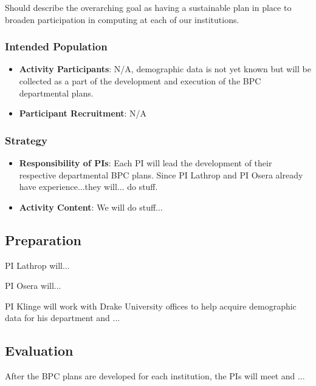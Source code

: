 \documentclass[11pt]{article}
\begin{document}
    Should describe the overarching goal as having a sustainable plan in place to broaden participation in computing at each of our institutions.

    \subsubsection{Intended Population}
    \begin{itemize}
    	\item 
	    \textbf{Activity Participants}: N/A, demographic data is not yet known but will be collected as a part of the development and execution of the BPC departmental plans.

	    \item 
	    \textbf{Participant Recruitment}: N/A
    \end{itemize}

    \subsubsection{Strategy}

    \begin{itemize}
    	\item 
	    \textbf{Responsibility of PIs}: Each PI will lead the development of their respective departmental BPC plans.
	    Since PI Lathrop and PI Osera already have experience...they will... do stuff.

	    \item 
	    \textbf{Activity Content}:
	    We will do stuff...
    \end{itemize}

    \subsection{Preparation}
    PI Lathrop will...

    PI Osera will...

    PI Klinge will work with Drake University offices to help acquire demographic data for his department and ...

    \subsection{Evaluation}
    After the BPC plans are developed for each institution, the PIs will meet and ...
\end{document}
